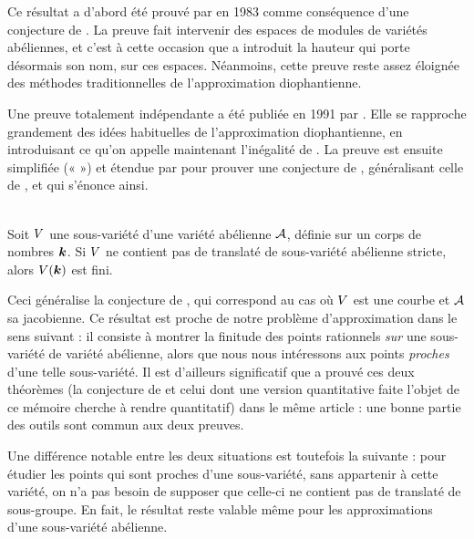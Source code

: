 Ce résultat a d'abord été prouvé par  en 1983 comme conséquence
d'une conjecture de  \cite{faldaav}. La preuve fait
intervenir des espaces de modules de variétés abéliennes, et c'est à cette
occasion que  a introduit la hauteur qui porte désormais son
nom, sur ces espaces. Néanmoins, cette preuve reste assez éloignée des
méthodes traditionnelles de l'approximation diophantienne.

Une preuve totalement indépendante a été publiée en 1991 par 
\cite{vojstcc}. Elle se rapproche grandement des idées habituelles de
l'approximation diophantienne, en introduisant ce qu'on appelle maintenant
l'inégalité de . La preuve est ensuite simplifiée («  ») et étendue par
 \cite{faldaav} pour prouver une conjecture de ,
généralisant celle de , et qui s'énonce ainsi.

\begin{thm}
  \label{t:fal1} ~\\
  Soit \( V \) une sous-variété d'une variété abélienne \( \mathcal A \), définie
  sur un corps de nombres \( {\boldsymbol k} \). Si \( V \) ne contient pas de
  translaté de sous-variété abélienne stricte, alors \( V({\boldsymbol k}) \) est
  fini.
\end{thm}

Ceci généralise la conjecture de , qui correspond au cas où \(
  V \) est une courbe et \( \mathcal A \) sa jacobienne. Ce résultat est proche
de notre problème d'approximation dans le sens suivant : il consiste à montrer
la finitude des points rationnels \emph{sur} une sous-variété de variété
abélienne, alors que nous nous intéressons aux points \emph{proches} d'une
telle sous-variété. Il est d'ailleurs significatif que  a prouvé
ces deux théorèmes (la conjecture de  et celui dont une
version quantitative faite l'objet de ce mémoire cherche à rendre quantitatif)
dans le même article : une bonne partie des outils sont commun aux deux
preuves.

Une différence notable entre les deux situations est toutefois la suivante :
pour étudier les points qui sont proches d'une sous-variété, sans appartenir
à cette variété, on n'a pas besoin de supposer que celle-ci ne contient pas de
translaté de sous-groupe. En fait, le résultat reste valable même pour les
approximations d'une sous-variété abélienne.

